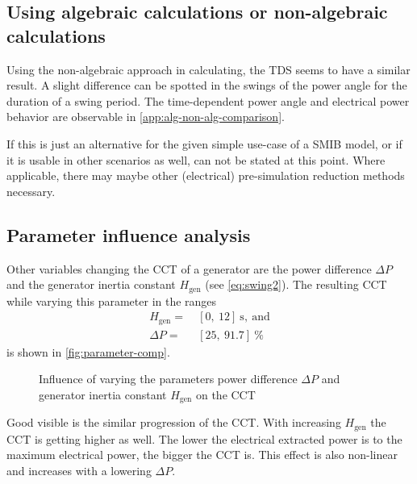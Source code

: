 \subsection{Using algebraic calculations or non-algebraic calculations}

Using the non-algebraic approach in calculating, the \acs{TDS} seems to have a similar result. A slight difference can be spotted in the swings of the power angle for the duration of a swing period. The time-dependent power angle and electrical power behavior are observable in \autoref{app:alg-non-alg-comparison}.

If this is just an alternative for the given simple use-case of a \acs{SMIB} model, or if it is usable in other scenarios as well, can not be stated at this point. Where applicable, there may maybe other (electrical) pre-simulation reduction methods necessary.



\subsection{Parameter influence analysis}

Other variables changing the \acs{CCT} of a generator are the power difference $\Delta P$ and the generator inertia constant $H_\mathrm{gen}$ (see \autoref{eq:swing2}). The resulting \acs{CCT} while varying this parameter in the ranges
\begin{align}
        H_\mathrm{gen}=&~[0,~12]~\mathrm{s},~\mathrm{and} \nonumber \\
        \Delta P=&~[25,~91.7]~\% \nonumber
\end{align}
is shown in \autoref{fig:parameter-comp}.

\begin{figure}[h]
        \centering
        
        \caption[Influence of parameter variation on the \acs{CCT}]{Influence of varying the parameters power difference $\Delta P$ and generator inertia constant $H_\mathrm{gen}$ on the \acf{CCT}}
        \label{fig:parameter-comp}
\end{figure}

Good visible is the similar progression of the \acs{CCT}. With increasing $H_\mathrm{gen}$ the \acs{CCT} is getting higher as well. The lower the electrical extracted power is to the maximum electrical power, the bigger the \acs{CCT} is. This effect is also non-linear and increases with a lowering $\Delta P$.

